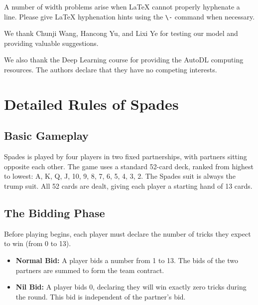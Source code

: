 \documentclass{article}
\begin{document}
A number of width problems arise when \LaTeX{} cannot properly hyphenate a
line. Please give LaTeX hyphenation hints using the \verb+\-+ command when
necessary.
\fi %

\begin{ack}
We thank Chunji Wang, Hancong Yu, and Lixi Ye for testing our model and providing valuable suggestions. 

We also thank the Deep Learning course for providing the AutoDL computing resources. The authors declare that they have no competing interests.
\end{ack}






\appendix



\section{Detailed Rules of Spades}
\label{app:rules}

\subsection{Basic Gameplay}
Spades is played by four players in two fixed partnerships, with partners sitting opposite each other. The game uses a standard 52-card deck, ranked from highest to lowest: A, K, Q, J, 10, 9, 8, 7, 6, 5, 4, 3, 2. The Spades suit is always the trump suit. All 52 cards are dealt, giving each player a starting hand of 13 cards.

\subsection{The Bidding Phase}
Before playing begins, each player must declare the number of tricks they expect to win (from 0 to 13). 
\begin{itemize}
    \item \textbf{Normal Bid:} A player bids a number from 1 to 13. The bids of the two partners are summed to form the team contract.
    \item \textbf{Nil Bid:} A player bids 0, declaring they will win exactly zero tricks during the round. This bid is independent of the partner's bid.
\end{itemize}
\end{document}
